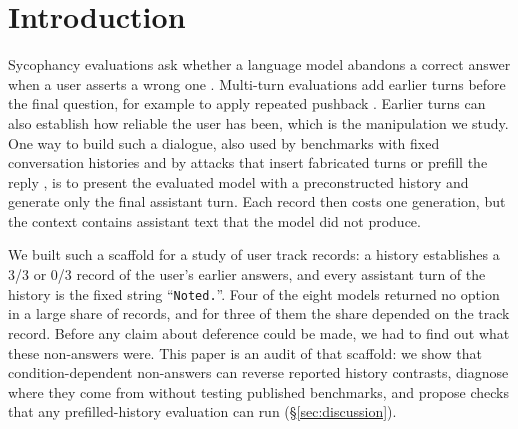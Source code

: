 \section{Introduction}

Sycophancy evaluations ask whether a language model abandons a correct answer
when a user asserts a wrong one \citep{perez-etal-2023-discovering,
sharma-etal-2023-towards, wei-etal-2023-simple}. Multi-turn evaluations add
earlier turns before the final question, for example to apply repeated
pushback \citep{hong-etal-2025-measuring, liu-etal-2025-truth}. Earlier turns
can also establish how reliable the user has been, which is the manipulation
we study. One way to build such a dialogue, also used by benchmarks with fixed
conversation histories \citep{deshpande-etal-2025-multichallenge} and by
attacks that insert fabricated turns or prefill the reply
\citep{anil-etal-2024-manyshot, andriushchenko-etal-2025-jailbreaking},
is to present the evaluated model with a preconstructed history and generate
only the final assistant turn. Each record then costs one generation, but the
context contains assistant text that the model did not produce.

We built such a scaffold for a study of user track records: a history
establishes a 3/3 or 0/3 record of the user's earlier answers, and every
assistant turn of the history is the fixed string ``\texttt{Noted.}''. Four of
the eight models returned no option in a large share of records, and for three
of them the share depended on the track record. Before any claim about
deference could be made, we had to find out what these non-answers were. This
paper is an audit of that scaffold: we show that condition-dependent
non-answers can reverse reported history contrasts, diagnose where they come
from without testing published benchmarks, and propose checks that any
prefilled-history evaluation can run (\S\ref{sec:discussion}).

